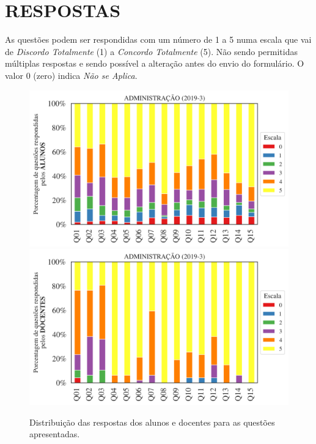 \documentclass[a4paper,10pt]{article}
\begin{document}
\section{RESPOSTAS}
As questões podem ser respondidas com um número de 1 a 5 numa escala que vai de {\it Discordo Totalmente} (1) a {\it Concordo Totalmente} (5). Não sendo permitidas múltiplas respostas e sendo possível a alteração antes do envio do formulário. O valor 0 (zero) indica {\it Não se Aplica}.


\begin{figure}[h]
\centering
\includegraphics[width=0.999\linewidth]{resposta_alunos_questoes_curso_1178684.png}
\includegraphics[width=0.999\linewidth]{resposta_docentes_questoes_curso_1178684.png}
\caption{\label{fig:resposta_questoes_curso}Distribuição das respostas dos alunos e docentes para as questões apresentadas. }
\end{figure}
\end{document}
